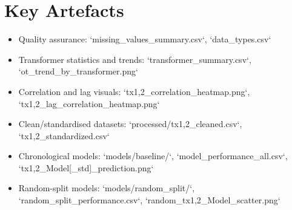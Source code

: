 \documentclass[11pt]{article}
\begin{document}
\section{Key Artefacts}
\begin{itemize}
    \item Quality assurance: `missing_values_summary.csv`, `data_types.csv`
    \item Transformer statistics and trends: `transformer_summary.csv`, `ot_trend_by_transformer.png`
    \item Correlation and lag visuals: `tx{1,2}_correlation_heatmap.png`, `tx{1,2}_lag_correlation_heatmap.png`
    \item Clean/standardised datasets: `processed/tx{1,2}_cleaned.csv`, `tx{1,2}_standardized.csv`
    \item Chronological models: `models/baseline/`, `model_performance_all.csv`, `tx{1,2}_{Model}[_std]_prediction.png`
    \item Random-split models: `models/random_split/`, `random_split_performance.csv`, `random_tx{1,2}_{Model}_scatter.png`
\end{itemize}
\end{document}
